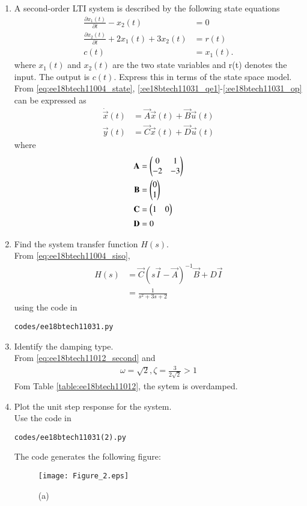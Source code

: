 \begin{enumerate}[label=\thesubsection.\arabic*.,ref=\thesubsection.\theenumi]

\item A second-order LTI system is described by the following state equations
\begin{align}
\label{:ee18btech11031_qe1}
\frac{\partial x_1(t)}{\partial t} - x_2(t) &= 0
\\
\label{:ee18btech11031_qe2}
\frac{\partial x_2(t)}{\partial t} + 2x_1(t) + 3x_2(t) &= r(t)
\\
c(t) &= x_1(t).
\label{:ee18btech11031_op}
\end{align}
%
where $x_1(t)$ and $x_2(t)$ are the two state variables and r(t) denotes the input. The output is $c(t)$.  Express this in terms of the state space model.
%
\\
\solution From \eqref{eq:ee18btech11004_state}, \eqref{:ee18btech11031_qe1}-\eqref{:ee18btech11031_op} can be expressed as
%
\begin{align}
\dot{\vec{x}}(t)&=\vec{A}\vec{x}(t)+\vec{B}\vec{u}(t) \\
 \vec{y}(t)&=\vec{C}\vec{x}(t)+\vec{D} \vec{u}(t)
\end{align}
%
where
\begin{align}
    \mathbf{A} &= \begin{pmatrix}0&1\\-2&-3\end{pmatrix}
\\
    \mathbf{B} &= \begin{pmatrix}0\\1\end{pmatrix}
\\
    \mathbf{C} &= \begin{pmatrix}1&0\end{pmatrix}
\\
    \mathbf{D} &= 0
\end{align}

\item Find the system transfer function $H(s)$.
%
\\
\solution From \eqref{eq:ee18btech11004_siso},
%
\begin{align}
H(s) &=  \vec{C}{(s\vec{I}-\vec{A})^{-1}}\vec{B}+D\vec{I}
\\
&  = \frac{1}{s^{2}+3s+2}
\label{eq:ee18btech11031_H}
\end{align}
%
using the code in 
\begin{lstlisting}
codes/ee18btech11031.py
\end{lstlisting}
%
\item Identify the damping type.
\\
\solution From \eqref{eq:ee18btech11012_second} and \label{eq:ee18btech11031_H}
%
\begin{align}
\omega = \sqrt{2}, \zeta = \frac{3}{2\sqrt{2}} > 1
\end{align}
Fom Table \ref{table:ee18btech11012}, the sytem is overdamped.
%
\item Plot the unit step response for the system.
\\
\solution Use the code in 
\begin{lstlisting}
codes/ee18btech11031(2).py
\end{lstlisting}

The code generates the following figure:
\begin{figure}[!h]
  \texttt{[image: Figure\_2.eps]}
  \caption{(a)}
  \label{fig:stepresponse}
\end{figure}
%
\end{enumerate}
